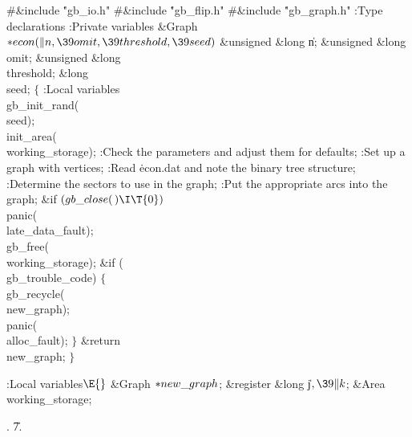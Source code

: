 \Y\B\8\#\&{include} \.{"gb\_io.h"}\6
\8\#\&{include} \.{"gb\_flip.h"}\6
\8\#\&{include} \.{"gb\_graph.h"}\6
\ATH\7
:Type declarations\X\6
:Private variables\X\7
\1\1\&{Graph} ${}{*}\\{econ}(\|n,\39\\{omit},\39\\{threshold},\39\\{seed}){}$\6
\&{unsigned} \&{long} \|n;\6
\&{unsigned} \&{long} \\{omit};\6
\&{unsigned} \&{long} \\{threshold};\6
\&{long} \\{seed};\2\2\6
${}\{{}$\5
\1:Local variables\X\7
\\{gb\_init\_rand}(\\{seed});\6
\\{init\_area}(\\{working\_storage});\6
:Check the parameters and adjust them for defaults\X;\6
:Set up a graph with  vertices\X;\6
:Read \.{econ.dat} and note the binary tree structure\X;\6
:Determine the  sectors to use in the graph\X;\6
:Put the appropriate arcs into the graph\X;\6
\&{if} ${}(\\{gb\_close}(\,)\I\T{0}){}$\1\5
\\{panic}(\\{late\_data\_fault});\2\6
\\{gb\_free}(\\{working\_storage});\6
\&{if} (\\{gb\_trouble\_code})\5
${}\{{}$\1\6
\\{gb\_recycle}(\\{new\_graph});\6
\\{panic}(\\{alloc\_fault});\6
\4${}\}{}$\2\6
\&{return} \\{new\_graph};\6
\4${}\}{}$\2\par
\fi

\B{}:Local variables\X${}\E{}$\6
\&{Graph} ${}{*}\\{new\_graph}{}$;\6
\&{register} \&{long} \|j${},\39\|k{}$;\6
\&{Area} \\{working\_storage};\par
{}.
\U7.\fi

